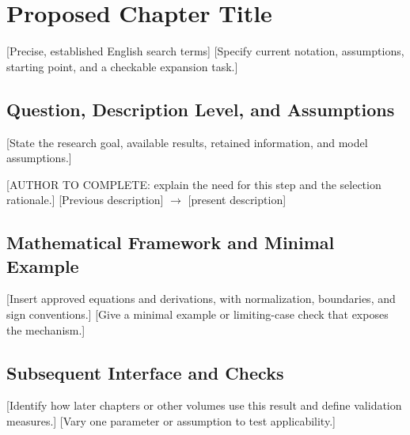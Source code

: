 \chapter{Proposed Chapter Title}\label{template:v1}
\begin{chaptersummary}
\end{chaptersummary}
{[Precise, established English search terms]}
{[Specify current notation, assumptions, starting point, and a checkable expansion task.]}

\section{Question, Description Level, and Assumptions}
[State the research goal, available results, retained information, and model assumptions.]

{[AUTHOR TO COMPLETE: explain the need for this step and the selection rationale.]}
{[Previous description] $\longrightarrow$ [present description]}

\section{Mathematical Framework and Minimal Example}
[Insert approved equations and derivations, with normalization, boundaries, and sign conventions.]
[Give a minimal example or limiting-case check that exposes the mechanism.]

\section{Subsequent Interface and Checks}
[Identify how later chapters or other volumes use this result and define validation measures.]
{[Vary one parameter or assumption to test applicability.]}

